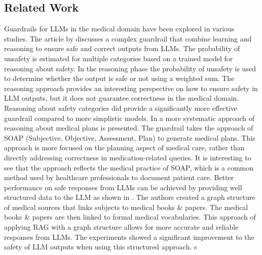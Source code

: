 %

\subsection{Related Work}
Guardrails for LLMs in the medical domain have been explored in various studies.
The article by \citep{kang2024r} discusses a complex guardrail that combine learning and reasoning to ensure safe and correct outputs from LLMs.
The probability of unsafety is estimated for multiple categories based on a trained model for reasoning about safety.
In the reasoning phase the probability of unsafety is used to determine whether the output is safe or not using a weighted sum.
The reasoning approach provides an interesting perspective on how to ensure safety in LLM outputs, but it does not guarantee correctness in the medical domain.
Reasoning about safety categories did provide a significantly more effective guardrail compared to more simplistic models.
In \citep{hsu2025medplan} a more systematic approach of reasoning about medical plans is presented.
The guardrail takes the approach of SOAP (Subjective, Objective, Assessment, Plan) to generate medical plans.
This approach is more focused on the planning aspect of medical care, rather than directly addressing correctness in medication-related queries.
It is interesting to see that the approach reflects the medical practice of SOAP, which is a common method used by healthcare professionals to document patient care.
Better performance on safe responses from LLMs can be achieved by providing well structured data to the LLM as shown in \citep{wu2024medical}.
The authors created a graph structure of medical sources that links subjects to medical books \& papers.
The medical books \& papers are then linked to formal medical vocabularies.
This approach of applying RAG with a graph structure allows for more accurate and reliable responses from LLMs.
The experiments showed a significant improvement to the safety of LLM outputs when using this structured approach.
s